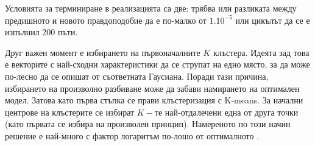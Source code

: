 \documentclass[main.tex]{subfiles}
\begin{document}
Условията за терминиране в реализацията са две: трябва или разликата между предишното и новото правдоподобие да е по-малко от $1.10^{-5}$ или цикълът да се е изпълнил 200 пъти.

Друг важен момент е избирането на първоначалните $K$ клъстера. Идеята зад това е векторите с най-сходни характеристики да се струпат на едно място, за да може по-лесно да се опишат от съответната Гаусиана. Поради тази причина, избирането на произволно разбиване може да забави намирането на оптимален модел. Затова като първа стъпка се прави клъстеризация с K-means. За начални центрове на клъстерите се избират $K-$те най-отдалечени една от друга точки (като първата се избира на произволен принцип). Намереното по този начин решение е най-много с фактор логаритъм по-лошо от оптималното \cite{kmeans}.
\end{document}
